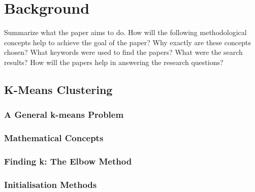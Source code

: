 \chapter{Background}
\label{cha:background}
Summarize what the paper aims to do.
How will the following methodological concepts help to achieve the goal of the paper?
Why exactly are these concepts chosen?
What keywords were used to find the papers?
What were the search results?
How will the papers help in answering the research questions?





%

\section{K-Means Clustering}
\label{sec:k_means_clustering}
\subsection{A General k-means Problem}
\subsection{Mathematical Concepts}
\subsection{Finding k: The Elbow Method}
\subsection{Initialisation Methods}
